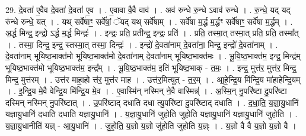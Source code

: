 \documentclass[17pt]{extarticle}
\begin{document}
29. दे॒वता॑ ए॒वैव दे॒वता॑ दे॒वता॑ ए॒व । . ए॒वावा वै॒वै वाव॑ । . अव॑ रुन्धे रु॒न्धे ऽवाव॑ रुन्धे । . रु॒न्धे॒ यद् यद् रु॑न्धे रुन्धे॒ यत् । . यथ् सर्वे॑षाꣳ॒॒ सर्वे॑षां॒ ॅयद् यथ् सर्वे॑षाम् । . सर्वे॑षा म॒र्द्ध म॒र्द्धꣳ सर्वे॑षाꣳ॒॒ सर्वे॑षा म॒र्द्धम् । . अ॒र्द्ध मिन्द्र॒ इन्द्रो॒ ऽर्द्ध म॒र्द्ध मिन्द्रः॑ । . इन्द्रः॒ प्रति॒ प्रतीन्द्र॒ इन्द्रः॒ प्रति॑ । . प्रति॒ तस्मा॒त् तस्मा॒त् प्रति॒ प्रति॒ तस्मा᳚त् । . तस्मा॒ दिन्द्र॒ इन्द्र॒ स्तस्मा॒त् तस्मा॒ दिन्द्रः॑ । . इन्द्रो॑ दे॒वता॑नाम् दे॒वता॑ना॒ मिन्द्र॒ इन्द्रो॑ दे॒वता॑नाम् । . दे॒वता॑नाम् भूयिष्ठ॒भाक्त॑मो भूयिष्ठ॒भाक्त॑मो दे॒वता॑नाम् दे॒वता॑नाम् भूयिष्ठ॒भाक्त॑मः । . भू॒यि॒ष्ठ॒भाक्त॑म॒ इन्द्र॒ मिन्द्र॑म् भूयिष्ठ॒भाक्त॑मो भूयिष्ठ॒भाक्त॑म॒ इन्द्र᳚म् । . भू॒यि॒ष्ठ॒भाक्त॑म॒ इति॑ भूयिष्ठ॒भाक् - त॒मः॒ । . इन्द्र॒ मुत्त॑र॒ मुत्त॑र॒ मिन्द्र॒ मिन्द्र॒ मुत्त॑रम् । . उत्त॑र माहा॒हो त्त॑र॒ मुत्त॑र माह । . उत्त॑र॒मित्युत् - त॒र॒म् । . आ॒हे॒न्द्रि॒य मि॑न्द्रि॒य मा॑हाहेन्द्रि॒यम् । . इ॒न्द्रि॒य मे॒वै वेन्द्रि॒य मि॑न्द्रि॒य मे॒व । . ए॒वास्मि॑न् नस्मिन् ने॒वै वास्मिन्न्॑ । . अ॒स्मि॒न् नु॒परि॑ष्टा दु॒परि॑ष्टा दस्मिन् नस्मिन् नु॒परि॑ष्टात् । . उ॒परि॑ष्टाद् दधाति दधा त्यु॒परि॑ष्टा दु॒परि॑ष्टाद् दधाति । . द॒धा॒ति॒ य॒ज्ञा॒यु॒धानि॑ यज्ञायु॒धानि॑ दधाति दधाति यज्ञायु॒धानि॑ । . य॒ज्ञा॒यु॒धानि॑ जुहोति जुहोति यज्ञायु॒धानि॑ यज्ञायु॒धानि॑ जुहोति । . य॒ज्ञा॒यु॒धानीति॑ यज्ञ् - आ॒यु॒धानि॑ । . जु॒हो॒ति॒ य॒ज्ञो य॒ज्ञो जु॑होति जुहोति य॒ज्ञ्ः । . य॒ज्ञो वै वै य॒ज्ञो य॒ज्ञो वै । \newline
\end{document}
